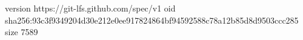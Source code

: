version https://git-lfs.github.com/spec/v1
oid sha256:93c3f9349204d30e212e0ee917824864bf94592588c78a12b85d8d9503ccc285
size 7589
